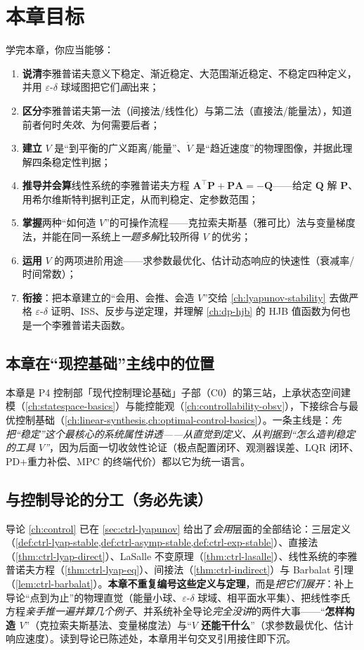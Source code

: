\section*{本章目标}
学完本章，你应当能够：
\begin{enumerate}
  \item \textbf{说清}李雅普诺夫意义下稳定、渐近稳定、大范围渐近稳定、不稳定四种定义，并用 $\varepsilon$-$\delta$ 球域图把它们\emph{画}出来；
  \item \textbf{区分}李雅普诺夫第一法（间接法/线性化）与第二法（直接法/能量法），知道前者何时\emph{失效}、为何需要后者；
  \item \textbf{建立} $V$ 是“到平衡的广义距离/能量”、$\dot V$ 是“趋近速度”的物理图像，并据此理解四条稳定性判据；
  \item \textbf{推导并会算}线性系统的李雅普诺夫方程 $\mathbf{A}^\top\mathbf{P}+\mathbf{P}\mathbf{A}=-\mathbf{Q}$——给定 $\mathbf{Q}$ 解 $\mathbf{P}$、用希尔维斯特判据判正定，从而判稳定、定参数范围；
  \item \textbf{掌握}两种“如何造 $V$”的可操作流程——克拉索夫斯基（雅可比）法与变量梯度法，并能在同一系统上\emph{一题多解}比较所得 $V$ 的优劣；
  \item \textbf{运用} $V$ 的两项进阶用途——求参数最优化、估计动态响应的快速性（衰减率/时间常数）；
  \item \textbf{衔接}：把本章建立的“会用、会推、会造 $V$”交给 \cref{ch:lyapunov-stability} 去做严格 $\varepsilon$-$\delta$ 证明、ISS、反步与逆定理，并理解 \cref{ch:dp-hjb} 的 HJB 值函数为何也是一个李雅普诺夫函数。
\end{enumerate}

\subsection*{本章在“现控基础”主线中的位置}
本章是 P4 控制部「现代控制理论基础」子部（C0）的第三站，上承状态空间建模（\cref{ch:statespace-basics}）与能控能观（\cref{ch:controllability-obsv}），下接综合与最优控制基础（\cref{ch:linear-synthesis,ch:optimal-control-basics}）。一条主线是：\emph{先把“稳定”这个最核心的系统属性讲透——从直觉到定义、从判据到“怎么造判稳定的工具 $V$”}，因为后面一切收敛性论证（极点配置闭环、观测器误差、LQR 闭环、PD+重力补偿、MPC 的终端代价）都以它为统一语言。

\subsection*{与控制导论的分工（务必先读）}
导论 \cref{ch:control} 已在 \cref{sec:ctrl-lyapunov} 给出了\emph{会用}层面的全部结论：三层定义（\cref{def:ctrl-lyap-stable,def:ctrl-asymp-stable,def:ctrl-exp-stable}）、直接法（\cref{thm:ctrl-lyap-direct}）、LaSalle 不变原理（\cref{thm:ctrl-lasalle}）、线性系统的李雅普诺夫方程（\cref{thm:ctrl-lyap-eq}）、间接法（\cref{thm:ctrl-indirect}）与 Barbalat 引理（\cref{lem:ctrl-barbalat}）。\textbf{本章不重复编号这些定义与定理}，而是\emph{把它们展开}：补上导论“点到为止”的物理直觉（能量小球、$\varepsilon$-$\delta$ 球域、相平面水平集）、把线性李氏方程\emph{亲手推一遍并算几个例子}、并系统补全导论\emph{完全没讲}的两件大事——“\textbf{怎样构造 $V$}”（克拉索夫斯基法、变量梯度法）与“\textbf{$V$ 还能干什么}”（求参数最优化、估计响应速度）。读到导论已陈述处，本章用半句交叉引用接住即下沉。

